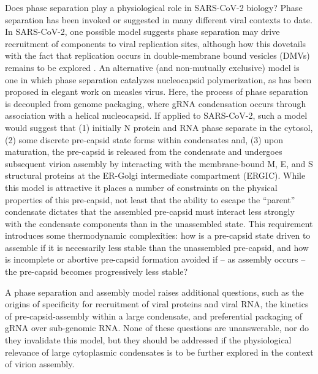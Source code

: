 \documentclass[../main.tex]{subfiles}
\begin{document}
        Does phase separation play a physiological role in SARS-CoV-2 biology? Phase separation has been invoked or suggested in many different viral contexts to date\cite{Nikolic2017-qx,Metrick2020-na,Heinrich2018-bu,Zhou2019-uv,Monette2020-do}. In SARS-CoV-2, one possible model suggests phase separation may drive  recruitment of components to viral replication sites, although how this dovetails with the fact that replication occurs in double-membrane bound vesicles (DMVs) remains to be explored \cite{Savastano2020-zf,Klein2020-vw}. An alternative (and non-mutually exclusive) model is one in which  phase separation catalyzes nucleocapsid polymerization, as has been proposed in elegant work on measles virus\cite{Guseva2020-nt}. Here, the process of phase separation is decoupled from genome packaging, where gRNA condensation occurs through association with a helical nucleocapsid. If applied to SARS-CoV-2, such a model would suggest that (1) initially N protein and RNA phase separate in the cytosol, (2) some discrete pre-capsid state forms within condensates and, (3) upon maturation, the pre-capsid is released from the condensate and undergoes subsequent virion assembly by interacting with the membrane-bound M, E, and S structural proteins at the ER-Golgi intermediate compartment (ERGIC). While this model is attractive it places a number of constraints on the physical properties of this pre-capsid, not least that the ability to escape the “parent” condensate dictates that the assembled pre-capsid must interact less strongly with the condensate components than in the unassembled state. This requirement introduces some thermodynamic complexities: how is a pre-capsid state driven to assemble if it is necessarily less stable than the unassembled pre-capsid, and how is incomplete or abortive pre-capsid formation avoided if – as assembly occurs – the pre-capsid becomes progressively less stable? 

        A phase separation and assembly model raises additional questions, such as the origins of specificity for recruitment of viral proteins and viral RNA, the kinetics of pre-capsid-assembly within a large condensate, and preferential packaging of gRNA over sub-genomic RNA. None of these questions are unanswerable, nor do they invalidate this model, but they should be addressed if the physiological relevance of large cytoplasmic condensates is to be further explored in the context of virion assembly. 
\end{document}
